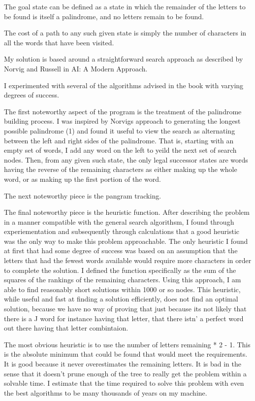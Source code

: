 The goal state can be defined as a state in which the remainder of the
letters to be found is itself a palindrome, and no letters remain to
be found.

The cost of a path to any such given state is simply the number of
characters in all the words that have been visited.

My solution is based around a straightforward search approach as
described by Norvig and Russell in AI: A Modern Approach.

I experimented with several of the algorithms advised in the book with
varying degrees of success.

The first noteworthy aspect of the program is the treatment of the
palindrome building process. I was inspired by Norvigs approach to
generating the longest possible palindrome (1) and found it useful to
view the search as alternating between the left and right sides of the
palindrome. That is, starting with an empty set of words, I add any
word on the left to yeild the next set of search nodes. Then, from any
given such state, the only legal successor states are words having the
reverse of the remaining characters as either making up the whole
word, or as making up the first portion of the word.

The next noteworthy piece is the pangram tracking.

The final noteworthy piece is the heuristic function. After describing
the problem in a manner compatible with the general search algorithsm,
I found through experiementation and subsequently through calculations
that a good heuristic was the only way to make this problem
approachable. The only heuristic I found at first that had some degree
of success was based on an assumption that the letters that had the
fewest words available would require more characters in order to
complete the solution. I defined the function specifically as the sum
of the squares of the rankings of the remaining characters. Using this
approach, I am able to find reasonably short solutions within 1000 or
so nodes. This heuristic, while useful and fast at finding a solution
efficiently, does not find an optimal solution, because we have no way
of proving that just because its not likely that there is a J word for
instance having that letter, that there istn' a perfect word out there
having that letter combintaion.

The most obvious heuristic is to use the number of letters remaining *
2 - 1. This is the absolute minimum that could be found that would
meet the requirements. It is good because it never overestimates the
remaining letters. It is bad in the sense that it doesn't prune enough
of the tree to really get the problem within a solvable time. I
estimate that the time required to solve this problem with even the
best algorithms to be many thousands of years on my machine.

